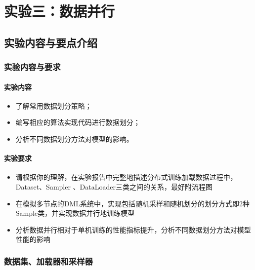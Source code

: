 \chapter{实验三：数据并行}

\section{实验内容与要点介绍}

\subsection{实验内容与要求}

\subsubsection{实验内容}
\begin{itemize}
    \item 了解常用数据划分策略；
    \item 编写相应的算法实现代码进行数据划分；
    \item 分析不同数据划分方法对模型的影响。
\end{itemize}


\subsubsection{实验要求}
\begin{itemize}
    \item 请根据你的理解，在实验报告中完整地描述分布式训练加载数据过程中，Dataset、Sampler 、DataLoader三类之间的关系，最好附流程图
    \item 在模拟多节点的DML系统中，实现包括随机采样和随机划分的划分方式即2种Sample类，并实现数据并行地训练模型
    \item 分析数据并行相对于单机训练的性能指标提升，分析不同数据划分方法对模型性能的影响
\end{itemize}


\subsection{数据集、加载器和采样器}

